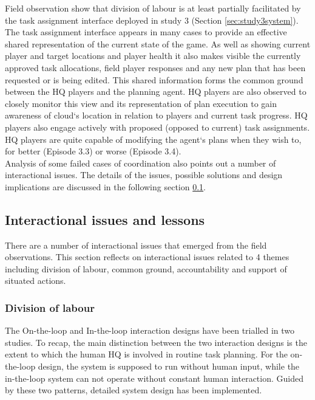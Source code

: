 Field observation show that division of labour is at least partially facilitated by the task assignment interface deployed in study 3 (Section \ref{sec:study3system}). The task assignment interface appears in many cases to provide an effective shared representation of the current state of the game. As well as showing current player and target locations and player health it also makes visible the currently approved task allocations, field player responses and any new plan that has been requested or is being edited. This shared information forms the common ground between the HQ players and the planning agent. HQ players are also observed to closely monitor this view and its representation of plan execution to gain awareness of cloud`s location in relation to players and current task progress. HQ players also engage actively with proposed (opposed to current) task assignments. HQ players are quite capable of modifying the agent`s plans when they wish to, for better (Episode 3.3) or worse (Episode 3.4).\\

Analysis of some failed cases of coordination also points out a number of interactional issues. The details of the issues, possible solutions and design implications are discussed in the following section \ref{sec:conclusionIssue}. \\


\subsection{Interactional issues and lessons}\label{sec:conclusionIssue}
There are a number of interactional issues that emerged from the field observations. This section reflects on interactional issues related to 4 themes including division of labour, common ground, accountability and support of situated actions.

\subsubsection{Division of labour}\label{sec:conclusionHH}
The On-the-loop and In-the-loop interaction designs have been trialled in two studies. To recap, the main distinction between the two interaction designs is the extent to which the human HQ is involved in routine task planning. For the on-the-loop design, the system is supposed to run without human input, while the in-the-loop system can not operate without constant human interaction. Guided by these two patterns, detailed system design has been implemented.\\

